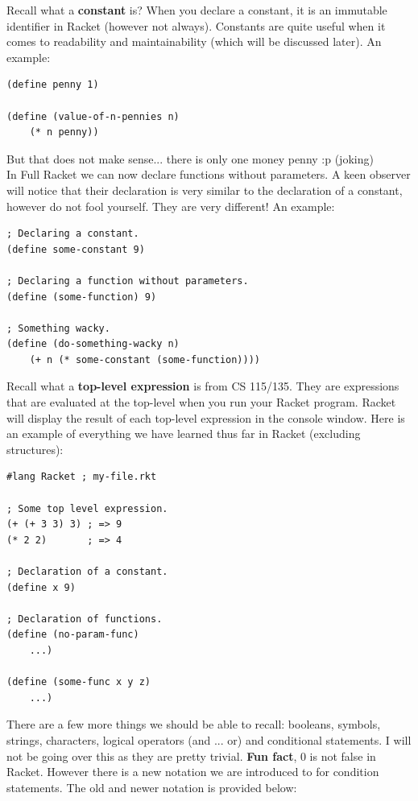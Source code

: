 \documentclass[12pt,extarticle]{article}
\begin{document}
Recall what a \textbf{constant} is? When you declare a constant, it is an immutable identifier in Racket (however not always). Constants are quite useful when it comes to readability and maintainability (which will be discussed later). An example:\\

\lstset {
	language=Lisp
}
\begin{lstlisting}
(define penny 1)

(define (value-of-n-pennies n)
	(* n penny))
\end{lstlisting}

But that does not make sense... there is only one money penny :p (joking)\\

In Full Racket we can now declare functions without parameters. A keen observer will notice that their declaration is very similar to the declaration of a constant, however do not fool yourself. They are very different! An example:\\

\lstset {
	language=Lisp
}
\begin{lstlisting}
; Declaring a constant.
(define some-constant 9)

; Declaring a function without parameters.
(define (some-function) 9)

; Something wacky.
(define (do-something-wacky n)
	(+ n (* some-constant (some-function))))
\end{lstlisting}

Recall what a \textbf{top-level expression} is from CS 115/135. They are expressions that are evaluated at the top-level when you run your Racket program. Racket will display the result of each top-level expression in the console window. Here is an example of everything we have learned thus far in Racket (excluding structures):\\

\lstset {
	language=Lisp
}
\begin{lstlisting}
#lang Racket ; my-file.rkt

; Some top level expression.
(+ (+ 3 3) 3) ; => 9
(* 2 2)       ; => 4

; Declaration of a constant.
(define x 9)

; Declaration of functions.
(define (no-param-func)
	...)

(define (some-func x y z)
	...)
\end{lstlisting}

There are a few more things we should be able to recall: booleans, symbols, strings, characters, logical operators (and ... or) and conditional statements. I will not be going over this as they are pretty trivial. \textbf{Fun fact}, 0 is not false in Racket. However there is a new notation we are introduced to for condition statements. The old and newer notation is provided below:\\
\end{document}
